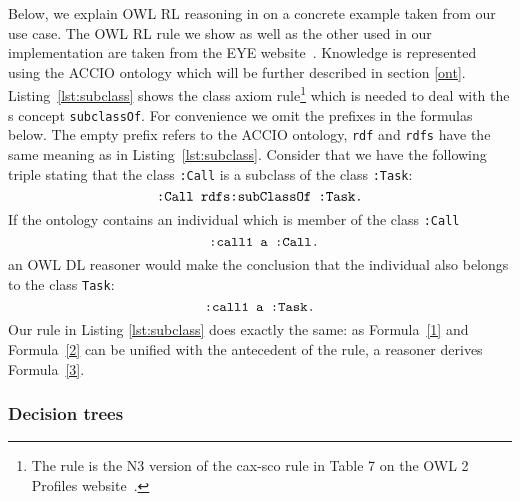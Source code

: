 Below, we explain OWL RL reasoning in \nthree on a concrete example taken from our use case.
The OWL RL rule we show as well as the other used in our implementation are taken from the EYE website~\cite{EYEowl}. %
Knowledge is represented using the ACCIO ontology \cite{accioont} which will be further described in section \ref{ont}.
Listing~\ref{lst:subclass} shows 
the class axiom rule\footnote{The rule is the N3 version of the cax-sco rule in Table 7 on the OWL 2 Profiles website~\cite{OWLRL}.} which is needed 
to deal with the \rdf{}s concept  \verb!subclassOf!.
For convenience we omit the prefixes in the formulas below. The empty prefix refers to the ACCIO ontology, 
 \verb!rdf! and \verb!rdfs! have the same meaning as in Listing~\ref{lst:subclass}. Consider that we have the following %
 triple stating that the class \verb!:Call!
 is 
 a subclass of the class \verb!:Task!:
\begin{equation}
 \verb!:Call rdfs:subClassOf :Task.! \label{1}
\end{equation}
If the ontology %
contains an individual which is member of the class \verb!:Call!
\begin{equation} \verb! :call1 a :Call.! \label{2}\end{equation}
an OWL DL reasoner would make the conclusion that the individual also belongs to the class \verb!Task!: 
\begin{equation}
 \verb!:call1 a :Task.! \label{3}
\end{equation}
Our rule in Listing \ref{lst:subclass} does exactly the same: as Formula~\ref{1} and Formula~\ref{2} can be unified with the antecedent of the rule, a reasoner derives
Formula~\ref{3}. 
%


\subsubsection{Decision trees}

